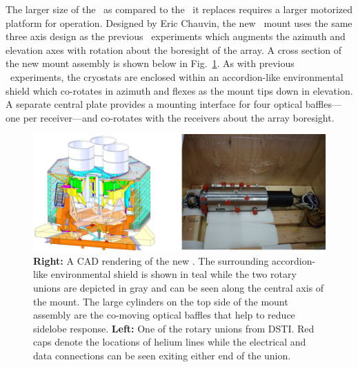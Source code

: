\documentclass[]{spie}  %
\begin{document}
The larger size of the \biceparray\ as compared to the \keckarray\ it replaces
requires a larger motorized platform for operation. Designed by Eric Chauvin,
the new \biceparray\ mount uses the same three axis design as the previous
\bk\ experiments which augments the azimuth and elevation axes with
rotation about the boresight of the array. A
cross section of the new mount assembly is shown below in Fig.~\ref{fig:bamount}.
As with previous \bk\ experiments, the cryostats
are enclosed within an accordion-like environmental shield which co-rotates in
azimuth and flexes as the mount tips down in elevation. A separate central
plate provides a mounting interface for four optical baffles---one per
receiver---and co-rotates with the receivers about the array boresight.


\begin{figure} [hb]
	\begin{center}
		\includegraphics[scale=0.65]{mount.png}
	\end{center}
	\caption{\textbf{Right:} A CAD rendering of the new \biceparray. The surrounding
	accordion-like environmental shield is shown in teal while the two rotary
	unions are depicted in gray and can be seen along the central axis of the
	mount. The large cylinders on the top side of the mount assembly are the co-moving optical baffles that help to reduce sidelobe response. \textbf{Left:} One of the rotary unions from DSTI. Red caps
	denote the locations of helium lines while the electrical and data connections
	can be seen exiting either end of the union.}
	\label{fig:bamount}
\end{figure}

\clearpage
\end{document}
